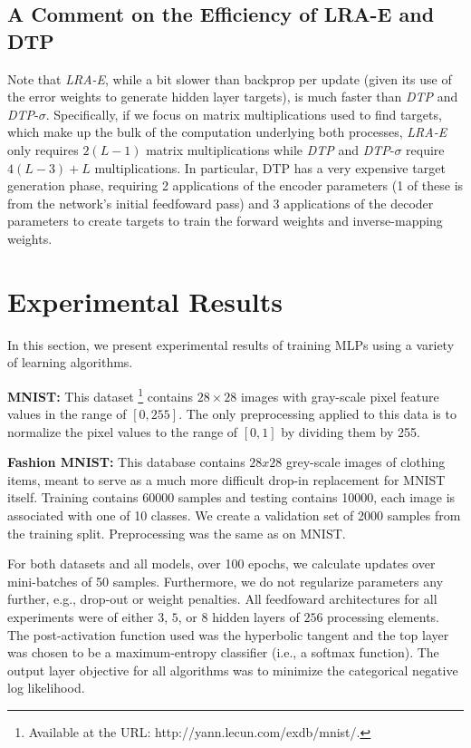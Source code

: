 \documentclass[letterpaper]{article} %
\begin{document}
\subsection{A Comment on the Efficiency of LRA-E and DTP}
Note that \emph{LRA-E}, while a bit slower than backprop per update (given its use of the error weights to generate hidden layer targets), is much faster than \emph{DTP} and \emph{DTP}-$\sigma$. Specifically, if we focus on matrix multiplications used to find targets, which make up the bulk of the computation underlying both processes, \emph{LRA-E} only requires $2 (L - 1)$ matrix multiplications while \emph{DTP} and \emph{DTP}-$\sigma$ require $4 (L-3) + L$ multiplications. In particular, DTP has a very expensive target generation phase, requiring 2 applications of the encoder parameters (1 of these is from the network's initial feedfoward pass) and 3 applications of the decoder parameters to create targets to train the forward weights and inverse-mapping weights.

\section{Experimental Results}
\label{sec:results}
In this section, we present experimental results of training MLPs using a variety of learning algorithms.

\textbf{MNIST:} This dataset \footnote{Available at the URL:  http://yann.lecun.com/exdb/mnist/.} contains $28\times28$ images with gray-scale pixel feature values in the range of $[0,255]$. The only preprocessing applied to this data is to normalize the pixel values to the range of $[0,1]$ by dividing them by 255.

\textbf{Fashion MNIST:} This database \cite{xiao2017fashion} contains $28x28$ grey-scale images of clothing items, meant to serve as a much more difficult drop-in replacement for MNIST itself. Training contains 60000 samples and testing contains 10000, each image is associated with one of 10 classes. We create a validation set of 2000 samples from the training split. Preprocessing was the same as on MNIST.

For both datasets and all models, over 100 epochs, we calculate updates over mini-batches of 50 samples. Furthermore, we do not regularize parameters any further, e.g., drop-out \cite{srivastava2014dropout} or weight penalties.
All feedfoward architectures for all experiments were of either $3$, $5$, or $8$ hidden layers of $256$ processing elements. The post-activation function used was the hyperbolic tangent and the top layer was chosen to be a maximum-entropy classifier (i.e., a softmax function). The output layer objective for all algorithms was to minimize the categorical negative log likelihood.
\end{document}
